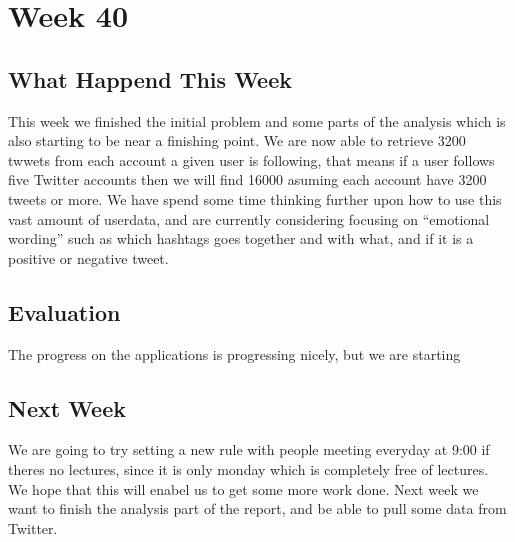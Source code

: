 \section*{Week 40}
\subsection*{What Happend This Week}
This week we finished the initial problem and some parts of the analysis which
is also starting to be near a finishing point. We are now able to retrieve 3200
twwets from each account a given user is following, that means if a user follows
five Twitter accounts then we will find 16000 asuming each account have 3200
tweets or more.
We have spend some time thinking further upon how to use this vast amount of
userdata, and are currently considering focusing on ``emotional wording'' such
as which hashtags goes together and with what, and if it is a positive or
negative tweet.

\subsection*{Evaluation}
The progress on the applications is progressing nicely, but we are starting 

\subsection*{Next Week}
We are going to try setting a new rule with people meeting everyday at 9:00 if
theres no lectures, since it is only monday which is completely free of
lectures. We hope that this will enabel us to get some more work done.
Next week we want to finish the analysis part of the report, and be able to pull
some data from Twitter.





% 

